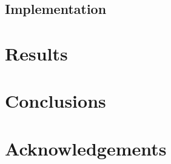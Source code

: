 \documentclass{egpubl}
\begin{document}
\subsection{Implementation}
\label{sec:implementation}

\section{Results}
\label{sec:results}

\section{Conclusions}
\label{sec:conclusions}

\section*{Acknowledgements}




\end{document}
